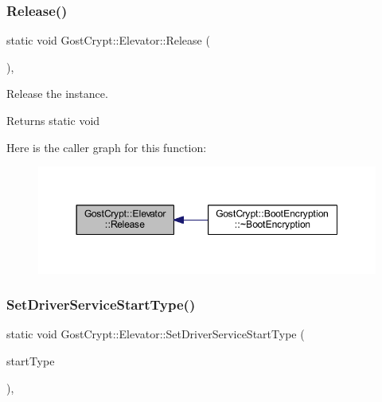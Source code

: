 \subsubsection{\texorpdfstring{Release()}{Release()}}
{\footnotesize\ttfamily static void Gost\+Crypt\+::\+Elevator\+::\+Release (\begin{DoxyParamCaption}{ }\end{DoxyParamCaption})\hspace{0.3cm}{\ttfamily [inline]}, {\ttfamily [static]}}



Release the instance. 

\begin{DoxyReturn}{Returns}
static void 
\end{DoxyReturn}
Here is the caller graph for this function\+:
\nopagebreak
\begin{figure}[H]
\begin{center}
\leavevmode
\includegraphics[width=350pt]{class_gost_crypt_1_1_elevator_a911b8cbe1a7aa7e2aebb7aec14dce4f7_icgraph}
\end{center}
\end{figure}
\mbox{\label{class_gost_crypt_1_1_elevator_a7756cd9baaf29a8375bf42210961504d}} 
\subsubsection{\texorpdfstring{Set\+Driver\+Service\+Start\+Type()}{SetDriverServiceStartType()}}
{\footnotesize\ttfamily static void Gost\+Crypt\+::\+Elevator\+::\+Set\+Driver\+Service\+Start\+Type (\begin{DoxyParamCaption}\item[{D\+W\+O\+RD}]{start\+Type }\end{DoxyParamCaption})\hspace{0.3cm}{\ttfamily [inline]}, {\ttfamily [static]}}



